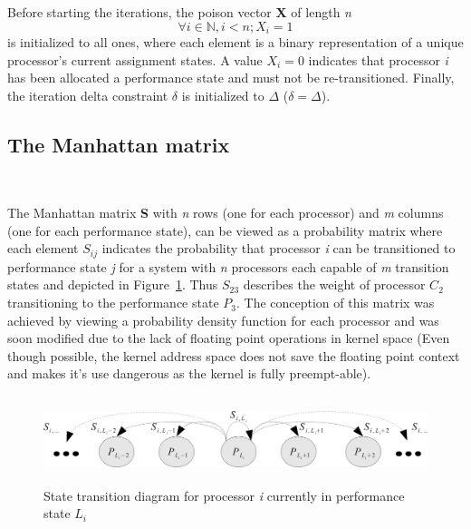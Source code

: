 Before starting the iterations, the poison vector \textbf{X} of length \textit{n} 
\begin{equation}
    \forall i \in \mathbb{N}, i < n; X_{i} = 1 
\label{eq:poison_init}
\end{equation}
is initialized to all ones, where
each element is a binary representation of a unique processor's current assignment states. A value 
$X_i = 0$ indicates that processor \textit{i} has been allocated a performance state and must not be re-transitioned. 
Finally, the iteration delta constraint $\delta$ is initialized to $\Delta$  ($\delta = \Delta$). 

\subsection{The Manhattan matrix}~\label{sec:delta_matrix}

The Manhattan matrix \textbf{S} with \textit{n} rows (one for each processor) and \textit{m} columns
(one for each performance state), can be viewed as a probability matrix where each element
$S_{ij}$ indicates the probability that processor \textit{i} can be transitioned to
performance state \textit{j} for a system with \textit{n} processors each 
capable of \textit{m} transition states and depicted in Figure~\ref{fig:state_transition}.
Thus $S_{23}$ describes the weight of processor $C_2$ transitioning to the performance state $P_3$. 
The conception of this matrix was achieved by viewing
a probability density function for each processor and was soon modified due to the lack of floating point operations in kernel space 
(Even though possible, the kernel address space does not save the floating point 
context and makes it's use dangerous as the kernel is fully preempt-able).

\begin{figure}[h!]
  \begin{center}
    \includegraphics[height=1in]{figures/StateTransition.jpg}
    \caption{State transition diagram for processor \textit{i} currently in performance state $L_i$}
    \label{fig:state_transition}
  \end{center}
\end{figure}


